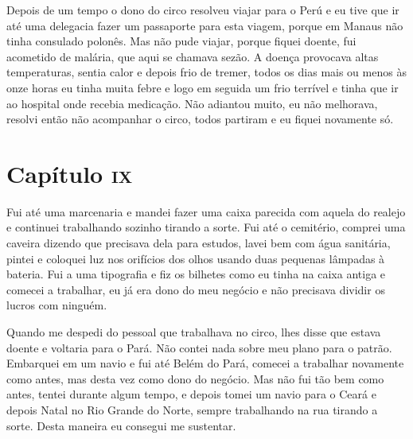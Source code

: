 Depois de um tempo o dono do circo resolveu viajar para o Perú e eu tive
que ir até uma delegacia fazer um passaporte para esta viagem, porque em
Manaus não tinha consulado polonês. Mas não pude viajar, porque fiquei
doente, fui acometido de malária, que aqui se chamava sezão. A doença
provocava altas temperaturas, sentia calor e depois frio de tremer,
todos os dias mais ou menos às onze horas eu tinha muita febre e logo em
seguida um frio terrível e tinha que ir ao hospital onde recebia
medicação. Não adiantou muito, eu não melhorava, resolvi então não
acompanhar o circo, todos partiram e eu fiquei novamente só.

\chapter{Capítulo \textsc{ix}}

Fui até uma marcenaria e mandei fazer uma caixa parecida com aquela do
realejo e continuei trabalhando sozinho tirando a sorte. Fui até o
cemitério, comprei uma caveira dizendo que precisava dela para estudos,
lavei bem com água sanitária, pintei e coloquei luz nos orifícios dos
olhos usando duas pequenas lâmpadas à bateria. Fui a uma tipografia e
fiz os bilhetes como eu tinha na caixa antiga e comecei a trabalhar, eu
já era dono do meu negócio e não precisava dividir os lucros com
ninguém.

Quando me despedi do pessoal que trabalhava no circo, lhes disse que
estava doente e voltaria para o Pará. Não contei nada sobre meu plano
para o patrão. Embarquei em um navio e fui até Belém do Pará, comecei a
trabalhar novamente como antes, mas desta vez como dono do negócio. Mas
não fui tão bem como antes, tentei durante algum tempo, e depois tomei
um navio para o Ceará e depois Natal no Rio Grande do Norte, sempre
trabalhando na rua tirando a sorte. Desta maneira eu consegui me
sustentar.

